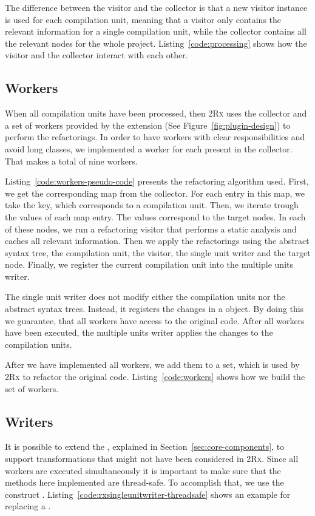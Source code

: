 \documentclass[type=bsc,accentcolor=tud9c]{tudthesis}
\newcommand{\toolcore}{\textsc{2Rx}}
\begin{document}
The difference between the visitor and the collector is that a new visitor instance is used for each compilation unit, meaning that a visitor only contains the relevant information for a single compilation unit, while the collector contains all the relevant nodes for the whole project. Listing~\ref{code:processing} shows how the visitor and the collector interact with each other.



\subsection{Workers}
When all compilation units have been processed, then \toolcore{} uses the collector and a set of workers provided by the extension (See Figure~\ref{fig:plugin-design}) to perform the refactorings. In order to have workers with clear responsibilities and avoid long classes, we implemented a worker for each  present in the collector. That makes a total of nine workers.

Listing~\ref{code:workers-pseudo-code} presents the refactoring algorithm used. First, we get the corresponding map from the collector. For each entry in this map, we take the key, which corresponds to a compilation unit. Then, we iterate trough the values of each map entry. The values correspond to the target nodes. In each of these nodes, we run a refactoring visitor that performs a static analysis and caches all relevant information. Then we apply the refactorings using the abstract syntax tree, the compilation unit, the visitor, the single unit writer and the target node. Finally, we register the current compilation unit into the multiple units writer.

The single unit writer does not modify either the compilation units nor the abstract syntax trees. Instead, it registers the changes in a  object. By doing this we guarantee, that all workers have access to the original code. After all workers have been executed, the multiple units writer applies the changes to the compilation units.



After we have implemented all workers, we add them to a set, which is used by \toolcore{} to refactor the original code. Listing~\ref{code:workers} shows how we build the set of workers.



\subsection{Writers}
It is possible to extend the , explained in Section~\ref{sec:core-components}, to support transformations that might not have been considered in \toolcore{}. Since all workers are executed simultaneously it is important to make sure that the methods here implemented are thread-safe. To accomplish that, we use the construct . Listing~\ref{code:rxsingleunitwriter-threadsafe} shows an example for replacing a .
\end{document}
